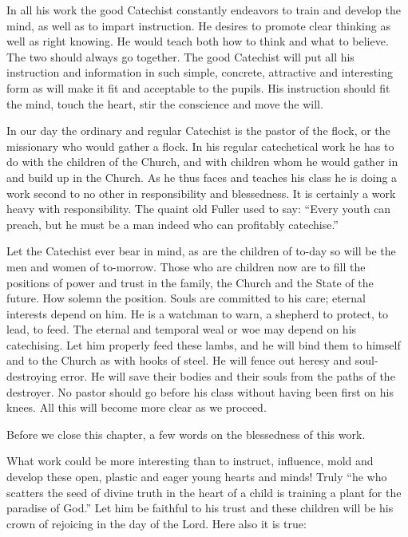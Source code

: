 In all his work the good Catechist constantly endeavors to train and develop the mind, as well as to impart instruction. He desires to promote clear thinking as well as right knowing. He would teach both how to think and what to believe. The two
should always go together.  The good Catechist will put all his instruction and information in such simple, concrete, attractive and interesting form as will make it fit and acceptable to the pupils. His instruction should fit the mind, touch the heart, stir the conscience and move the will.

In our day the ordinary and regular Catechist is the pastor of the flock, or the missionary who would gather a flock. In his regular catechetical work he has to do with the children of the Church, and with children whom he would gather in and build up in the Church. As he thus faces and teaches his class he is doing a work second to no other in responsibility and blessedness. It is certainly a work heavy with responsibility. The quaint old Fuller used to say: “Every youth can preach, but he must be a man indeed who can profitably catechise.”

 Let the Catechist ever bear in mind, as are the children of to-day so will be the men and women of to-morrow. Those who are children now are to fill the positions of power and trust in the family, the Church and the State of the future. How solemn the position. Souls are committed to his care; eternal interests depend on him. He is a watchman to warn, a shepherd to protect, to lead, to feed. The eternal and temporal weal or woe may depend on his catechising. Let him properly feed these lambs, and he will bind them to himself and to the Church
as with hooks of steel. He will fence out heresy and soul-destroying error. He will save their bodies and their souls from the paths of the destroyer. No pastor should go before his class without having been first on his knees. All this will become more clear as we proceed.

Before we close this chapter, a few words on the blessedness of this work.

 What work could be more interesting than to instruct, influence, mold and develop these open, plastic and eager young hearts and minds! Truly “he who scatters the seed of divine truth in the heart of a child is training a plant for the paradise of God.” Let him be faithful to his trust and these children will be his crown of rejoicing in the day of the Lord. Here also it is true:

